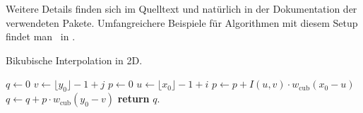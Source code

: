 Weitere Details finden sich im Quelltext und natürlich in der Dokumentation der verwendeten Pakete.
Umfangreichere Beispiele für Algorithmen mit diesem Setup findet man \ua\ in \cite{BurgerBurge06}.


\begin{algorithm}
\caption{Bikubische Interpolation in 2D.}
\label{alg:xyz}
\smallskip
%
\begin{algorithmic}[1] %
 
\State $q \gets 0$
 
	\State $v \gets \lfloor y_0 \rfloor - 1 + j$
	\State $p \gets 0$ 
	 
	  \State $u \gets \lfloor x_0 \rfloor - 1 + i$
	  \State $p \gets p + I(u,v) \cdot w_{\mathrm{cub}}(x_0 - u )$ 
	\EndFor
	\State $q \gets q + p \cdot w_{\mathrm{cub}}(y_0 - v)$
\EndFor
\State \textbf{return} $q$.
\EndProcedure
\end{algorithmic}%
\smallskip
%
\end{algorithm}